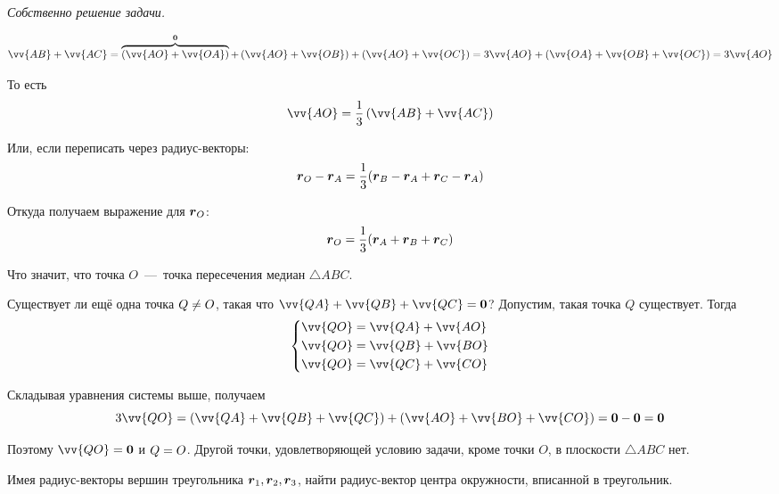 \documentclass[a4paper,12pt]{article}
\begin{document}
\begin{solution}
    \medskip
    
    \emph{Собственно решение задачи.}
    
    \[
      \vv{AB} + \vv{AC}
      = \overbrace{\left(\vv{AO} + \vv{OA}\right)}^{\bds 0} + \left(\vv{AO} + \vv{OB}\right) + \left(\vv{AO} + \vv{OC}\right)
      = 3 \vv{AO} + \left(\vv{OA} + \vv{OB} + \vv{OC}\right)
      = 3 \vv{AO}
    \]
    
    То есть
    \[
      \vv{AO} = \frac{1}{3} \left(\vv{AB} + \vv{AC}\right)
    \]
    
    Или, если переписать через радиус-векторы:
    \[
      \boldsymbol r_O - \boldsymbol r_A = \frac{1}{3} (\boldsymbol r_B - \boldsymbol r_A + \boldsymbol r_C - \boldsymbol r_A)
    \]
    
    Откуда получаем выражение для $\boldsymbol r_O$:
    \[
      \boldsymbol r_O = \frac{1}{3} (\boldsymbol r_A + \boldsymbol r_B + \boldsymbol r_C)
    \]
    
    Что значит, что точка $O$~---~точка пересечения медиан $\triangle ABC$.
    
    Существует ли ещё одна точка $Q \hm{\not=} O$, такая что $\vv{QA} \hm+ \vv{QB} \hm+ \vv{QC} \hm= \bds 0$?
    Допустим, такая точка $Q$ существует.
    Тогда
    \[
      \left\{
        \begin{aligned}
          &\vv{QO} = \vv{QA} + \vv{AO}\\
          &\vv{QO} = \vv{QB} + \vv{BO}\\
          &\vv{QO} = \vv{QC} + \vv{CO}
        \end{aligned}
      \right.
    \]
    
    Складывая уравнения системы выше, получаем
    \[
      3 \vv{QO} = \left(\vv{QA} + \vv{QB} + \vv{QC}\right) + \left(\vv{AO} + \vv{BO} + \vv{CO}\right)
      = \bds 0 - \bds 0 = \bds 0
    \]
    
    Поэтому $\vv{QO} \hm= \bds 0$ и $Q \hm= O$.
    Другой точки, удовлетворяющей условию задачи, кроме точки $O$, в плоскости $\triangle ABC$ нет.
  \end{solution}
  
  
  \begin{problem}[1.36]
    Имея радиус-векторы вершин треугольника $\boldsymbol r_1, \boldsymbol r_2, \boldsymbol r_3$, найти радиус-вектор центра окружности, вписанной в треугольник.
  \end{problem}
  
\end{document}
